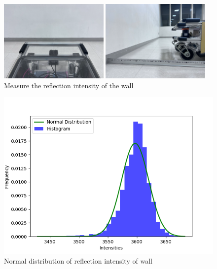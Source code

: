   \begin{figure}[h]
    \centering
    \begin{minipage}[c]{65mm} 
        \centering
        \includegraphics[height=40mm]{images/RobotGuidance_exp1_wall_from_back.png}
    \end{minipage}
    \begin{minipage}[c]{65mm} 
        \centering
        \includegraphics[height=40mm]{images/RobotGuidance_exp1_wall_from_side.png}
    \end{minipage}
    \caption{Measure the reflection intensity of the wall}
    \label{Fig:RobotGuidance_exp1_wall}
  \end{figure}

  \begin{figure}[h]
    \centering
    \includegraphics[keepaspectratio, scale=0.50] {images/RobotGuidance_plot_reflection_intensities_of_wall.png}
    \captionsetup{justification=raggedright} %
    \caption{Normal distribution of reflection intensity of wall}
    \label{Fig:Normal distribution of reflection intensity of wall}
  \end{figure}

